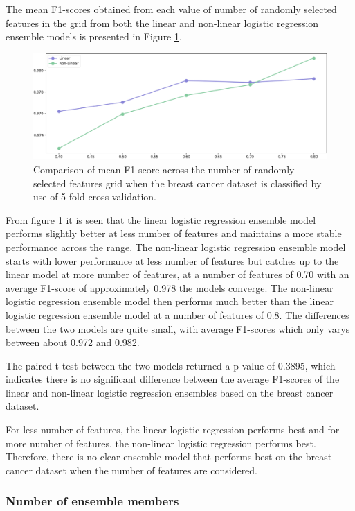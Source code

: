 \documentclass[10pt, conference]{IEEEtran}
\begin{document}
The mean F1-scores obtained from each value of number of randomly selected features in the grid from both the linear and non-linear
logistic regression ensemble models is presented in Figure \ref{fig:BC_features_comparison}.
\begin{figure}[H]
    \centerline{\includegraphics[scale=0.26]{../Images/BC_features.PNG}}
    \caption{Comparison of mean F1-score across the number of randomly selected features grid when the breast cancer dataset is classified by use of 5-fold cross-validation.}
    \label{fig:BC_features_comparison}
\end{figure}
From figure \ref{fig:BC_features_comparison} it is seen that the linear logistic regression ensemble model performs slightly better
at less number of features and maintains a more stable performance across the range. The non-linear logistic regression ensemble model
starts with lower performance at less number of features but catches up to the linear model at more number of features,
at a number of features of 0.70 with an average F1-score of approximately 0.978 the models converge. The non-linear
logistic regression ensemble model then performs much better than the linear logistic regression ensemble model at a number
of features of 0.8. The differences between the two models are quite small, with average F1-scores which only varys between about
0.972 and 0.982.

The paired t-test between the two models returned a p-value of 0.3895, which indicates there is no significant difference
between the average F1-scores of the linear and non-linear logistic regression ensembles based on the breast cancer dataset.

For less number of features, the linear logistic regression performs best and for more number of
features, the non-linear logistic regression performs best. Therefore, there is no clear ensemble model
that performs best on the breast cancer dataset when the number of features are considered.

\subsubsection{Number of ensemble members}
\end{document}
